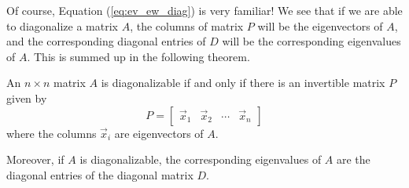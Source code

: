 \documentclass{ximera}
\begin{document}
Of course, Equation (\ref{eq:ev_ew_diag}) is very familiar!  We see that if we are able to diagonalize a matrix $A$, the columns of matrix $P$ will be the eigenvectors of $A$, and the corresponding diagonal entries of $D$ will be the corresponding eigenvalues of $A$.  This is summed up in the following theorem.

\begin{theorem}\label{th:eigenvectorsanddiagonalizable}
An $n\times n$ matrix $A$ is diagonalizable if and only if there is an
invertible matrix $P$ given by
\begin{equation*}
P=\begin{bmatrix}
\vec{x}_1 & \vec{x}_2 & \cdots & \vec{x}_n
\end{bmatrix}
\end{equation*}
where the columns $\vec{x}_i$ are eigenvectors of $A$.

Moreover, if $A$ is diagonalizable, the corresponding eigenvalues of $A$ are the
diagonal entries of the diagonal matrix $D$.
\end{theorem}
\end{document}
